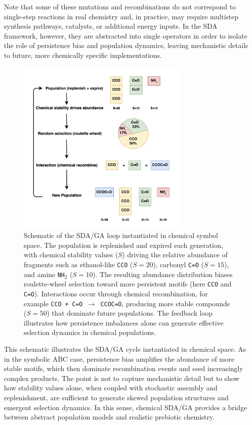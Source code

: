 \documentclass[life,article,submit,pdftex,moreauthors]{Definitions/mdpi}
\begin{document}
Note that some of these mutations and recombinations do not correspond to single-step reactions in real chemistry and, in practice, may require multistep synthesis pathways, catalysts, or additional energy inputs. In the SDA framework, however, they are abstracted into single operators in order to isolate the role of persistence bias and population dynamics, leaving mechanistic details to future, more chemically specific implementations.

\begin{figure}[H]
    \centering
    \includegraphics[width=0.75\textwidth]{SDA-Chem.png}
    \caption{Schematic of the SDA/GA loop instantiated in chemical symbol space. 
    The population is replenished and expired each generation, with chemical 
    stability values ($S$) driving the relative abundance of fragments such as 
    ethanol-like \texttt{CCO} ($S=20$), carbonyl \texttt{C=O} ($S=15$), and amine 
    \texttt{NH$_2$} ($S=10$). The resulting abundance distribution biases 
    roulette-wheel selection toward more persistent motifs (here \texttt{CCO} 
    and \texttt{C=O}). Interactions occur through chemical recombination, for 
    example \texttt{CCO + C=O $\to$ CCOC=O}, producing more stable compounds 
    ($S=50$) that dominate future populations. The feedback loop illustrates how 
    persistence imbalances alone can generate effective selection dynamics in 
    chemical populations.}
    \label{fig:sda-chem-loop}
\end{figure}

This schematic illustrates the SDA/GA cycle instantiated in chemical space. As in the symbolic ABC case, persistence bias amplifies the abundance of more stable motifs, which then dominate recombination events and seed increasingly complex products. The point is not to capture mechanistic detail but to show how stability values alone, when coupled with stochastic assembly and replenishment, are sufficient to generate skewed population structures and emergent selection dynamics. In this sense, chemical SDA/GA provides a bridge between abstract population models and realistic prebiotic chemistry.
\end{document}
